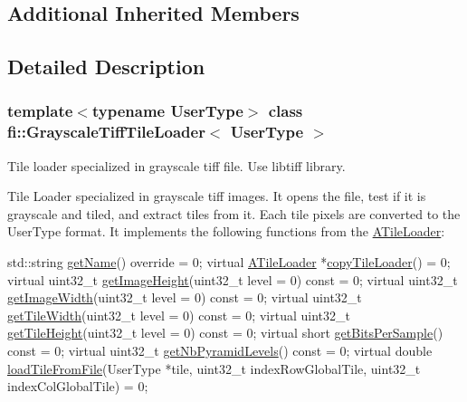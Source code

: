 \subsection*{Additional Inherited Members}


\subsection{Detailed Description}
\subsubsection*{template$<$typename User\+Type$>$\newline
class fi\+::\+Grayscale\+Tiff\+Tile\+Loader$<$ User\+Type $>$}

Tile loader specialized in grayscale tiff file. Use libtiff library. 

Tile Loader specialized in grayscale tiff images. It opens the file, test if it is grayscale and tiled, and extract tiles from it. Each tile\textquotesingle{} pixels are converted to the User\+Type format. It implements the following functions from the \hyperlink{classfi_1_1ATileLoader}{A\+Tile\+Loader}\+: 
\begin{DoxyCode}
std::string \hyperlink{classfi_1_1GrayscaleTiffTileLoader_a66be68fc0c11aefbcb141ddb8c9e4deb}{getName}() \textcolor{keyword}{override} = 0;
\textcolor{keyword}{virtual} \hyperlink{classfi_1_1ATileLoader_a853a3209bab3a5e024f9d1ca7c8933f3}{ATileLoader} *\hyperlink{classfi_1_1GrayscaleTiffTileLoader_a57eb82e8bcdf71d2cd5f16f93bbe24a4}{copyTileLoader}() = 0;
\textcolor{keyword}{virtual} uint32\_t \hyperlink{classfi_1_1GrayscaleTiffTileLoader_aedb905b521b888c68a59d20695c33e51}{getImageHeight}(uint32\_t level = 0) \textcolor{keyword}{const} = 0;
\textcolor{keyword}{virtual} uint32\_t \hyperlink{classfi_1_1GrayscaleTiffTileLoader_ab20446c55b7ae2fea97490e76a73f934}{getImageWidth}(uint32\_t level = 0) \textcolor{keyword}{const} = 0;
\textcolor{keyword}{virtual} uint32\_t \hyperlink{classfi_1_1GrayscaleTiffTileLoader_a273613b0ebb48732c449399fac614ebd}{getTileWidth}(uint32\_t level = 0) \textcolor{keyword}{const} = 0;
\textcolor{keyword}{virtual} uint32\_t \hyperlink{classfi_1_1GrayscaleTiffTileLoader_aa1ac88ed6b9505d5c98b9202e6f1ee6d}{getTileHeight}(uint32\_t level = 0) \textcolor{keyword}{const} = 0;
\textcolor{keyword}{virtual} \textcolor{keywordtype}{short} \hyperlink{classfi_1_1GrayscaleTiffTileLoader_a80ae5ca350571d2c993a68d40bdc39c9}{getBitsPerSample}() \textcolor{keyword}{const} = 0;
\textcolor{keyword}{virtual} uint32\_t \hyperlink{classfi_1_1GrayscaleTiffTileLoader_a3a915d36a8c88a687b04ee8d5a15ecb0}{getNbPyramidLevels}() \textcolor{keyword}{const} = 0;
\textcolor{keyword}{virtual} \textcolor{keywordtype}{double} \hyperlink{classfi_1_1GrayscaleTiffTileLoader_af52ec5177c51882b9544ee9684f7a2ae}{loadTileFromFile}(UserType *tile, uint32\_t indexRowGlobalTile, uint32\_t 
      indexColGlobalTile) = 0;
\end{DoxyCode}



